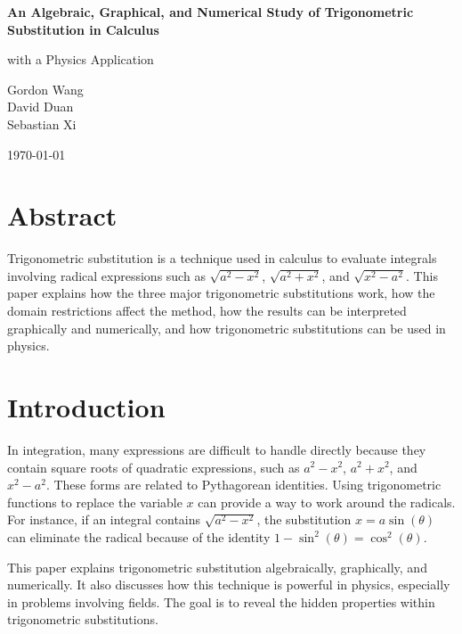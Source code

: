 \documentclass[12pt]{article}
\begin{document}
\begin{titlepage}
\centering
\vspace*{1.2in}

{\huge\bfseries An Algebraic, Graphical, and Numerical Study of Trigonometric Substitution in Calculus\par}

\vspace{0.25in}

{\Large with a Physics Application
\par}

\vspace{1.1in}

{\large
Gordon Wang\\
David Duan\\
Sebastian Xi
\par}

\vfill

{\large \today\par}

\end{titlepage}

\section*{Abstract}
Trigonometric substitution is a technique used in calculus to evaluate integrals involving radical expressions such as \(\sqrt{a^2 - x^2}\), \(\sqrt{a^2 + x^2}\), and \(\sqrt{x^2 - a^2}\). This paper explains how the three major trigonometric substitutions work, how the domain restrictions affect the method, how the results can be interpreted graphically and numerically, and how trigonometric substitutions can be used in physics.

\section{Introduction}

In integration, many expressions are difficult to handle directly because they contain square roots of quadratic expressions, such as \(a^2 - x^2\), \(a^2 + x^2\), and \(x^2 - a^2\). These forms are related to Pythagorean identities. Using trigonometric functions to replace the variable \(x\) can provide a way to work around the radicals. For instance, if an integral contains \(\sqrt{a^2 - x^2}\), the substitution \(x = a\sin(\theta)\) can eliminate the radical because of the identity \(1 - \sin^2(\theta) = \cos^2(\theta)\).

This paper explains trigonometric substitution algebraically, graphically, and numerically. It also discusses how this technique is powerful in physics, especially in problems involving fields. The goal is to reveal the hidden properties within trigonometric substitutions.
\end{document}
